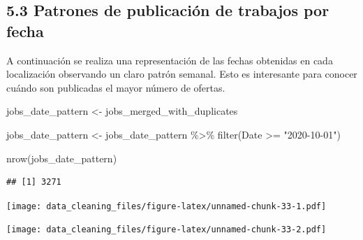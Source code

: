 \documentclass[
]{article}
\newenvironment{Shaded}{\begin{snugshade}}{\end{snugshade}}
\newcommand{\KeywordTok}[1]{\textcolor[rgb]{0.94,0.87,0.69}{#1}}
\newcommand{\NormalTok}[1]{\textcolor[rgb]{0.80,0.80,0.80}{#1}}
\newcommand{\OperatorTok}[1]{\textcolor[rgb]{0.94,0.94,0.82}{#1}}
\newcommand{\StringTok}[1]{\textcolor[rgb]{0.80,0.58,0.58}{#1}}
\begin{document}
\hypertarget{patrones-de-publicaciuxf3n-de-trabajos-por-fecha}{%
\subsection{5.3 Patrones de publicación de trabajos por
fecha}\label{patrones-de-publicaciuxf3n-de-trabajos-por-fecha}}

A continuación se realiza una representación de las fechas obtenidas en
cada localización observando un claro patrón semanal. Esto es
interesante para conocer cuándo son publicadas el mayor número de
ofertas.

\begin{Shaded}
\begin{Highlighting}[]
\NormalTok{jobs\_date\_pattern \textless{}{-}}\StringTok{ }\NormalTok{jobs\_merged\_with\_duplicates}

\NormalTok{jobs\_date\_pattern \textless{}{-}}\StringTok{ }\NormalTok{jobs\_date\_pattern }\OperatorTok{\%\textgreater{}\%}
\StringTok{  }\KeywordTok{filter}\NormalTok{(Date }\OperatorTok{\textgreater{}=}\StringTok{ "2020{-}10{-}01"}\NormalTok{)}

\KeywordTok{nrow}\NormalTok{(jobs\_date\_pattern)}
\end{Highlighting}
\end{Shaded}

\begin{verbatim}
## [1] 3271
\end{verbatim}

\begin{Shaded}
\end{Shaded}

\texttt{[image: data\_cleaning\_files/figure-latex/unnamed-chunk-33-1.pdf]}

\begin{Shaded}
\end{Shaded}

\texttt{[image: data\_cleaning\_files/figure-latex/unnamed-chunk-33-2.pdf]}
\end{document}
